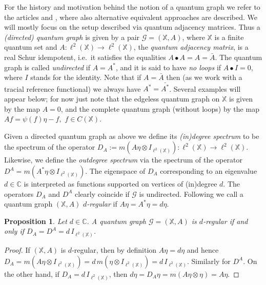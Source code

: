 \documentclass[12pt]{amsart}
\newtheorem{prop}[thm]{Proposition}
\theoremstyle{definition}
\theoremstyle{definition}
\theoremstyle{definition}
\theoremstyle{definition}
\newcommand{\I}{{I}}
\newcommand{\X}{\mathbb{X}}
\newcommand{\C}{\mathbb{C}}
\newcommand{\Gr}{\mathcal{G}}
\numberwithin{equation}{section}
\begin{document}


For the history and motivation behind the notion of a quantum graph we refer to the articles \cite{Was24} and \cite{Daw24}, where also alternative equivalent approaches are described. We will mostly focus on the setup described via quantum adjacency matrices. Thus a \emph{(directed) quantum graph} is given by a pair $\Gr=(\X,A)$, where $\X$ is a finite quantum set and $A\colon \ell^2(\X)\to \ell^2(\X)$, the \emph{quantum adjacency matrix}, is a real Schur idempotent, i.e.\ it satisfies the equalities $A\bullet A=A=\bar A$. The quantum graph is called \emph{undirected} if $A=A^*$,  and it is said to have \emph{no loops} if $A\bullet \I=0$, where $\I$ stands for the identity. Note that if $A=\bar{A}$ then (as we work with a tracial reference functional) we always have $A^* = \bar{A^*}$.
Several examples will appear below; for now just note that the edgeless quantum graph on $\X$ is given by the map $A = 0$, and the complete quantum graph (without loops) by the map $Af = \psi(f) \eta-f,$ $f \in C(\X)$.


Given a directed quantum graph as above we define its \emph{(in)degree spectrum} to be the spectrum of the operator $D_A:=m(A\eta\otimes\I_{\ell^2(\X)}):\ell^2(\X) \to \ell^2(\X)$.  Likewise, we define the \emph{outdegree spectrum} via the spectrum of the operator $D^A=m(A^*\eta\otimes\I_{\ell^2(\X)})$. The eigenspace of $D_A$ corresponding to an eigenvalue $d\in \C$ is interpreted as functions supported on vertices of (in)degree $d$. The operators $D_A$ and $D^A$ clearly coincide if $\Gr$ is undirected. Following \cite[Definition 2.24]{Mat22} we call a quantum graph $(\X,A)$ \emph{$d$-regular} if $A\eta=A^*\eta=d\eta$.

\begin{prop}
  Let $d \in \C$.  A quantum graph $\Gr=(\X,A)$ is $d$-regular if and only if $D_A=D^A=d\,\I_{\ell^2(\X)}$.
\end{prop}
\begin{proof}If $(\X,A)$ is $d$-regular, then by definition $A\eta=d\eta$ and hence $D_A=m(A\eta\otimes\I_{\ell^2(\X)})=d\,m(\eta\otimes\I_{\ell^2(\X)})=d\,\I_{\ell^2(\X)}$. Similarly for $D^A$. On the other hand, if $D_A=d\,\I_{\ell^2(\X)}$, then $d\eta=D_A\eta=m(A\eta\otimes\eta)=A\eta$.
\end{proof}
\end{document}

